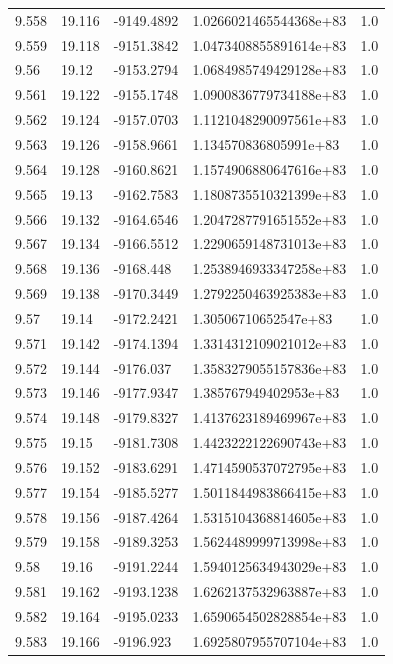 \begin{tabular}{lllll}
9.558 & 19.116 & -9149.4892 & 1.0266021465544368e+83 & 1.0 \\
9.559 & 19.118 & -9151.3842 & 1.0473408855891614e+83 & 1.0 \\
9.56 & 19.12 & -9153.2794 & 1.0684985749429128e+83 & 1.0 \\
9.561 & 19.122 & -9155.1748 & 1.0900836779734188e+83 & 1.0 \\
9.562 & 19.124 & -9157.0703 & 1.1121048290097561e+83 & 1.0 \\
9.563 & 19.126 & -9158.9661 & 1.134570836805991e+83 & 1.0 \\
9.564 & 19.128 & -9160.8621 & 1.1574906880647616e+83 & 1.0 \\
9.565 & 19.13 & -9162.7583 & 1.1808735510321399e+83 & 1.0 \\
9.566 & 19.132 & -9164.6546 & 1.2047287791651552e+83 & 1.0 \\
9.567 & 19.134 & -9166.5512 & 1.2290659148731013e+83 & 1.0 \\
9.568 & 19.136 & -9168.448 & 1.2538946933347258e+83 & 1.0 \\
9.569 & 19.138 & -9170.3449 & 1.2792250463925383e+83 & 1.0 \\
9.57 & 19.14 & -9172.2421 & 1.30506710652547e+83 & 1.0 \\
9.571 & 19.142 & -9174.1394 & 1.3314312109021012e+83 & 1.0 \\
9.572 & 19.144 & -9176.037 & 1.3583279055157836e+83 & 1.0 \\
9.573 & 19.146 & -9177.9347 & 1.385767949402953e+83 & 1.0 \\
9.574 & 19.148 & -9179.8327 & 1.4137623189469967e+83 & 1.0 \\
9.575 & 19.15 & -9181.7308 & 1.4423222122690743e+83 & 1.0 \\
9.576 & 19.152 & -9183.6291 & 1.4714590537072795e+83 & 1.0 \\
9.577 & 19.154 & -9185.5277 & 1.5011844983866415e+83 & 1.0 \\
9.578 & 19.156 & -9187.4264 & 1.5315104368814605e+83 & 1.0 \\
9.579 & 19.158 & -9189.3253 & 1.5624489999713998e+83 & 1.0 \\
9.58 & 19.16 & -9191.2244 & 1.5940125634943029e+83 & 1.0 \\
9.581 & 19.162 & -9193.1238 & 1.6262137532963887e+83 & 1.0 \\
9.582 & 19.164 & -9195.0233 & 1.6590654502828854e+83 & 1.0 \\
9.583 & 19.166 & -9196.923 & 1.6925807955707104e+83 & 1.0 \\

\end{tabular}
